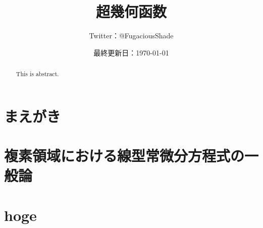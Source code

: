 \documentclass[a4paper,oneside,openany]{ltjsbook} %
\title{超幾何函数}
\author{Twitter：@FugaciousShade}
\date{最終更新日：\today}
\begin{document}
\maketitle %

\chapter*{まえがき}{
    
}

\setcounter{tocdepth}{4}  %
\tableofcontents  %




\chapter{複素領域における線型常微分方程式の一般論}{
    \begin{abstract}
        This is abstract.
    \end{abstract}
    
    \fi
}


\appendix
{}
\chapter{hoge}{
}
\fi




\end{document}
